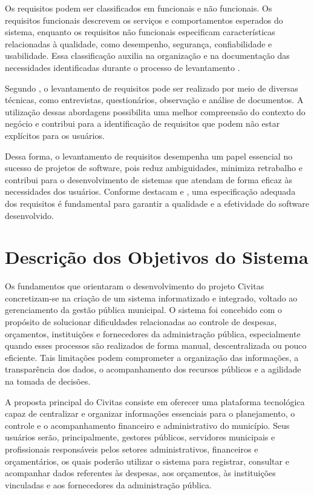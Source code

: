 Os requisitos podem ser classificados em funcionais e não funcionais. Os requisitos funcionais descrevem os serviços e comportamentos esperados do sistema, enquanto os requisitos não funcionais especificam características relacionadas à qualidade, como desempenho, segurança, confiabilidade e usabilidade. Essa classificação auxilia na organização e na documentação das necessidades identificadas durante o processo de levantamento \parencite{Sommerville2018ES10}.

Segundo \textcite{Pressman2020}, o levantamento de requisitos pode ser realizado por meio de diversas técnicas, como entrevistas, questionários, observação e análise de documentos. A utilização dessas abordagens possibilita uma melhor compreensão do contexto do negócio e contribui para a identificação de requisitos que podem não estar explícitos para os usuários.

Dessa forma, o levantamento de requisitos desempenha um papel essencial no sucesso de projetos de software, pois reduz ambiguidades, minimiza retrabalho e contribui para o desenvolvimento de sistemas que atendam de forma eficaz às necessidades dos usuários. Conforme destacam \textcite{Pressman2020} e \textcite{Sommerville2018ES10}, uma especificação adequada dos requisitos é fundamental para garantir a qualidade e a efetividade do software desenvolvido.

\section{Descrição dos Objetivos do Sistema}

Os fundamentos que orientaram o desenvolvimento do projeto Civitas concretizam-se na criação de um sistema informatizado e integrado, voltado ao gerenciamento da gestão pública municipal. O sistema foi concebido com o propósito de solucionar dificuldades relacionadas ao controle de despesas, orçamentos, instituições e fornecedores da administração pública, especialmente quando esses processos são realizados de forma manual, descentralizada ou pouco eficiente. Tais limitações podem comprometer a organização das informações, a transparência dos dados, o acompanhamento dos recursos públicos e a agilidade na tomada de decisões.

A proposta principal do Civitas consiste em oferecer uma plataforma tecnológica capaz de centralizar e organizar informações essenciais para o planejamento, o controle e o acompanhamento financeiro e administrativo do município. Seus usuários serão, principalmente, gestores públicos, servidores municipais e profissionais responsáveis pelos setores administrativos, financeiros e orçamentários, os quais poderão utilizar o sistema para registrar, consultar e acompanhar dados referentes às despesas, aos orçamentos, às instituições vinculadas e aos fornecedores da administração pública.

